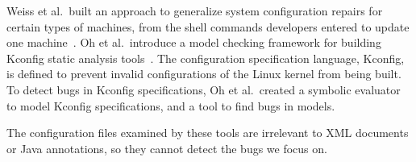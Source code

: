 Weiss et al.~built an approach to generalize system configuration repairs for certain types of machines, from the shell commands developers entered to update one machine~\cite{Weiss:2017:TIS}. 
Oh et al.~introduce a model checking framework for building Kconfig static analysis tools~\cite{Oh2021}. The configuration specification language, Kconfig, is defined to prevent invalid configurations of the Linux kernel from being built. %
To detect bugs in Kconfig specifications, Oh et al.~created a symbolic evaluator  to model Kconfig specifications, and a tool to find bugs in  models. 

The configuration files examined by these tools are irrelevant to XML documents or Java annotations, so they cannot detect the bugs we  focus on.
